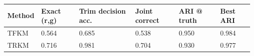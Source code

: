 \begin{tabular}{llllll}
\toprule
Method & Exact (r,g) & Trim decision acc. & Joint correct & ARI @ truth & Best ARI \\
\midrule
TFKM & 0.564 & 0.685 & 0.538 & 0.950 & 0.984 \\
TRKM & 0.716 & 0.981 & 0.704 & 0.930 & 0.977 \\
\bottomrule
\end{tabular}
